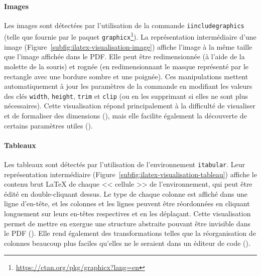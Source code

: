 \paragraph{Images}
Les images sont détectées par l'utilisation de la commande \texttt{iincludegraphics} (telle que fournie par le paquet \texttt{graphicx}\footnote{\url{https://ctan.org/pkg/graphicx?lang=en}}).
La représentation intermédiaire d'une image (Figure~\ref{subfig:ilatex-visualisation-image}) affiche l'image à la même taille que l'image affichée dans le PDF.
Elle peut être redimensionnée (à l'aide de la molette de la souris) et rognée (en redimensionnant le masque représenté par le rectangle avec une bordure sombre et une poignée).
Ces manipulations mettent automatiquement à jour les paramètres de la commande en modifiant les valeurs des clés \texttt{width}, \texttt{height}, \texttt{trim} et \texttt{clip} (ou en les supprimant si elles ne sont plus nécessaires).
Cette visualisation répond principalement à la difficulté de visualiser et de formaliser des dimensions (), mais elle facilite également la découverte de certains paramètres utiles ().

\paragraph{Tableaux}
Les tableaux sont détectés par l'utilisation de l'environnement \texttt{itabular}.
Leur représentation intermédiaire (Figure~\ref{subfig:ilatex-visualisation-tableau}) affiche le contenu brut \LaTeX{} de chaque << cellule >> de l'environnement, qui peut être édité en double-cliquant dessus.
Le type de chaque colonne est affiché dans une ligne d'en-tête, et les colonnes et les lignes peuvent être réordonnées en cliquant longuement sur leurs en-têtes respectives et en les déplaçant.
Cette visualisation permet de mettre en exergue une structure abstraite pouvant être invisible dans le PDF ().
Elle rend également des transformations telles que la réorganisation de colonnes beaucoup plus faciles qu'elles ne le seraient dans un éditeur de code ().

